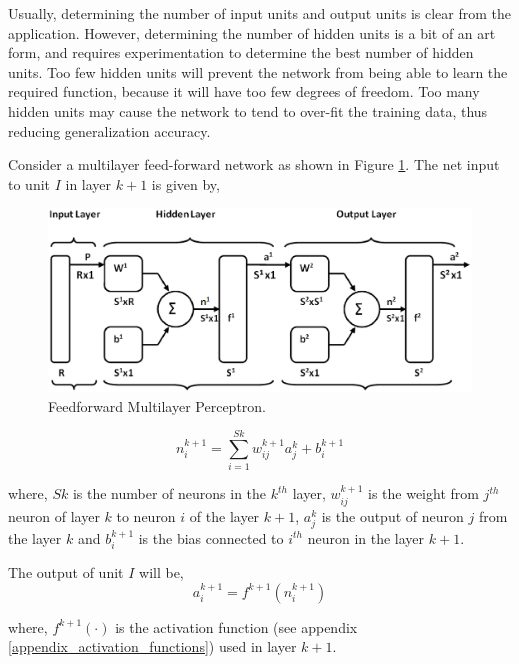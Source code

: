 Usually, determining the number of input units and output units is clear from the application. However, determining the number of hidden units is a bit of an art form, and requires experimentation to determine the best number of hidden units. Too few hidden units will prevent the network from being able to learn the required function, because it will have too few degrees of freedom. Too many hidden units may cause the network to tend to over-fit the training data, thus reducing generalization accuracy.

Consider a multilayer feed-forward network as shown in Figure \ref{figure_mlp}. The net input to unit $I$ in layer $k+1$ is given by,

\begin{figure}[h]
\centering
\includegraphics[width=350pt]{figures/ann/MLP.eps}
\caption{Feedforward Multilayer Perceptron.}
\label{figure_mlp}
\end{figure}


\begin{equation}
n^{k+1}_i=\sum\limits_{i=1}^{Sk}w^{k+1}_{ij}a^{k}_{j}+b^{k+1}_i
\end{equation}\label{equation_feed_forward_input_to_k_layer}

where, $Sk$ is the number of neurons in the $k^{th}$ layer, $w^{k+1}_{ij}$ is the weight from $j^{th}$ neuron of layer $k$ to neuron $i$ of the layer $k+1$, $a^{k}_{j}$ is the output of neuron $j$ from the layer $k$ and $b^{k+1}_{i}$ is the bias connected to $i^{th}$ neuron in the layer $k+1$.

The output of unit $I$ will be,
\begin{equation}
a^{k+1}_{i}=f^{k+1}(n^{k+1}_{i})
\end{equation}\label{equation_feed_forward_output_from_k_layer}

where, $f^{k+1}(\cdot)$ is the activation function (see appendix \ref{appendix_activation_functions}) used in layer $k+1$.

